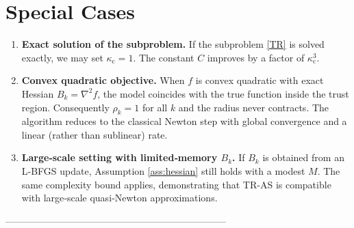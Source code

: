 \documentclass{article}
\begin{document}
\section*{Special Cases}
\begin{enumerate}[label=\alph*.]
\item \textbf{Exact solution of the subproblem.}
If the subproblem \eqref{TR} is solved exactly, we may set
\(\kappa_{\mathrm{c}}=1\).  The constant \(C\) improves by a factor of
\(\kappa_{\mathrm{c}}^{3}\).

\item \textbf{Convex quadratic objective.}
When \(f\) is convex quadratic with exact Hessian \(B_{k}=\nabla^{2}f\),
the model coincides with the true function inside the trust region.
Consequently \(\rho_{k}=1\) for all \(k\) and the radius never contracts.
The algorithm reduces to the classical Newton step with global
convergence and a linear (rather than sublinear) rate.

\item \textbf{Large‑scale setting with limited‑memory \(B_{k}\).}
If \(B_{k}\) is obtained from an L‑BFGS update, Assumption \ref{ass:hessian}
still holds with a modest \(M\).  The same complexity bound applies,
demonstrating that TR‑AS is compatible with large‑scale quasi‑Newton
approximations.
\end{enumerate}

---------------------------------------------------------------------
\end{document}
